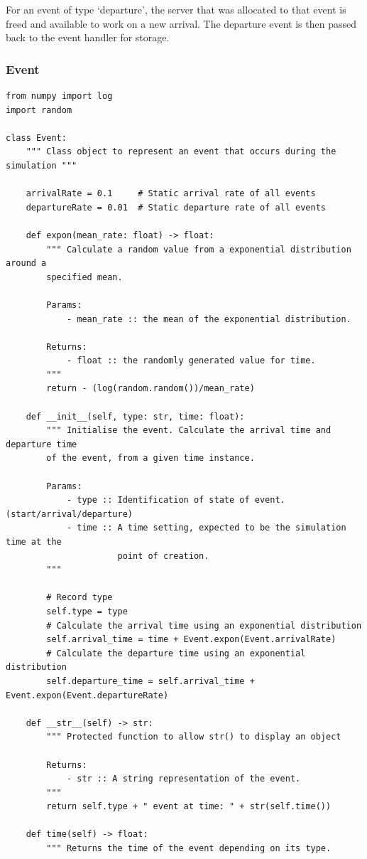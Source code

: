 \documentclass{ecmm427_assignment}
\begin{document}
For an event of type `departure', the server that was allocated to that event is freed and available to work on a new arrival. The departure event is then passed back to the event handler for storage.

\subsubsection{Event}
\begin{verbatim}
from numpy import log
import random

class Event:
    """ Class object to represent an event that occurs during the simulation """

    arrivalRate = 0.1     # Static arrival rate of all events
    departureRate = 0.01  # Static departure rate of all events

    def expon(mean_rate: float) -> float:
        """ Calculate a random value from a exponential distribution around a
        specified mean.

        Params:
            - mean_rate :: the mean of the exponential distribution.

        Returns:
            - float :: the randomly generated value for time.
        """
        return - (log(random.random())/mean_rate)

    def __init__(self, type: str, time: float):
        """ Initialise the event. Calculate the arrival time and departure time 
        of the event, from a given time instance.

        Params:
            - type :: Identification of state of event.(start/arrival/departure)
            - time :: A time setting, expected to be the simulation time at the 
                      point of creation.
        """

        # Record type
        self.type = type
        # Calculate the arrival time using an exponential distribution
        self.arrival_time = time + Event.expon(Event.arrivalRate)
        # Calculate the departure time using an exponential distribution 
        self.departure_time = self.arrival_time + Event.expon(Event.departureRate)

    def __str__(self) -> str:
        """ Protected function to allow str() to display an object 
        
        Returns:
            - str :: A string representation of the event.
        """
        return self.type + " event at time: " + str(self.time())

    def time(self) -> float:
        """ Returns the time of the event depending on its type.
        

\end{verbatim}
\end{document}
